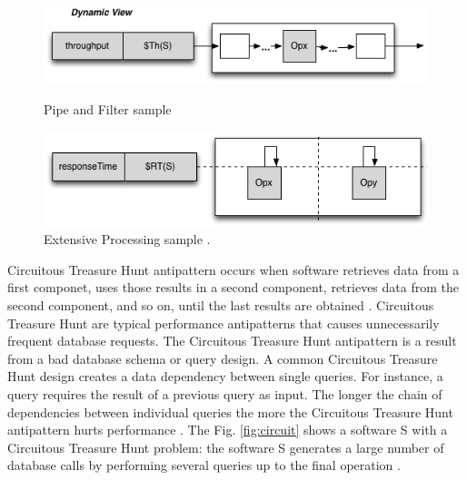 \documentclass{report}
\begin{document}
\begin{figure}[h]
\begin{minipage}{.5\textwidth}
\centering
\includegraphics[width=1\textwidth]{./images/pipe2.png}
\caption{Pipe and Filter sample \cite{Vetoio2011}}
\label{fig:pipefilter}
\end{minipage}
\begin{minipage}{.5\textwidth}
\centering
\includegraphics[width=1\textwidth]{./images/extpro.png}
\caption{Extensive Processing sample \cite{Vetoio2011}.}
\label{fig:extpro}
\end{minipage}
\end{figure}


Circuitous Treasure Hunt antipattern occurs when software retrieves data from a first componet, uses those results in a second component, retrieves data from the second component, and so on, until the last results are obtained \cite{Smith2002} \cite{Smith2003}. Circuitous Treasure Hunt
are typical performance antipatterns that causes unnecessarily frequent database requests. The Circuitous Treasure Hunt antipattern is a result from a bad database schema or query design. A common Circuitous Treasure Hunt design creates a data dependency between single queries. For instance, a query requires the
result of a previous query as input. The longer the chain of
dependencies between individual queries the more the Circuitous
Treasure Hunt antipattern hurts performance \cite{Wert2014}. The Fig. \ref{fig:circuit}  shows a software S with a Circuitous Treasure Hunt problem: the software  S generates a large number of database calls by performing several queries up to the final operation \cite{Vetoio2011}.
\end{document}
